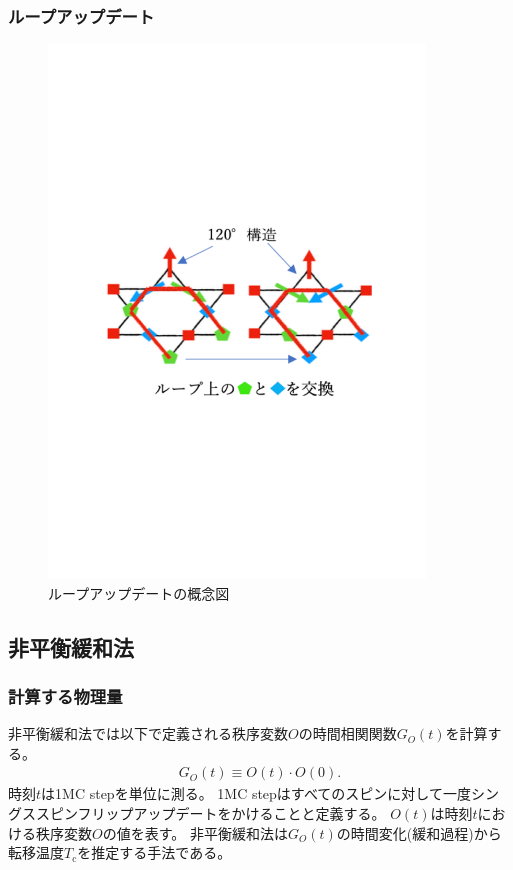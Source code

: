 \documentclass[12pt,titlepage,dvipdfmx]{jarticle}
\begin{document}
\subsubsection{ループアップデート}

\begin{figure}[tbh]
   \centering
   \includegraphics[width=10cm]{figure/loop_update.pdf}
   \caption{ループアップデートの概念図}
\end{figure}

\newpage

\subsection{非平衡緩和法}

\subsubsection{計算する物理量}
非平衡緩和法では以下で定義される秩序変数$O$の時間相関関数$G_O(t)$を計算する。
\begin{align}
   G_{O}(t) \equiv O(t) \cdot O(0).
\end{align}
時刻$t$は1MC stepを単位に測る。
1MC stepはすべてのスピンに対して一度シングススピンフリップアップデートをかけることと定義する。
$O(t)$は時刻$t$における秩序変数$O$の値を表す。
非平衡緩和法は$G_O(t)$の時間変化(緩和過程)から転移温度$T_{\mathrm{c}}$を推定する手法である。
\end{document}
